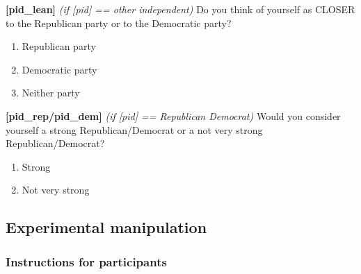 \documentclass[
]{article}
\providecommand{\tightlist}{%
  \setlength{\itemsep}{0pt}\setlength{\parskip}{0pt}}
\begin{document}
\textbf{{[}pid\_lean{]}} \emph{(if {[}pid{]} == other \textbar{}
independent)} Do you think of yourself as CLOSER to the Republican party
or to the Democratic party?

\begin{enumerate}
\def\labelenumi{\arabic{enumi}.}
\tightlist
\item
  Republican party
\item
  Democratic party
\item
  Neither party
\end{enumerate}

\textbf{{[}pid\_rep/pid\_dem{]}} \emph{(if {[}pid{]} == Republican
\textbar{} Democrat)} Would you consider yourself a strong
Republican/Democrat or a not very strong Republican/Democrat?

\begin{enumerate}
\def\labelenumi{\arabic{enumi}.}
\tightlist
\item
  Strong
\item
  Not very strong
\end{enumerate}

\hypertarget{experimental-manipulation}{%
\subsection{Experimental manipulation}\label{experimental-manipulation}}

\hypertarget{instructions-for-participants}{%
\subsubsection{Instructions for
participants}\label{instructions-for-participants}}
\end{document}
